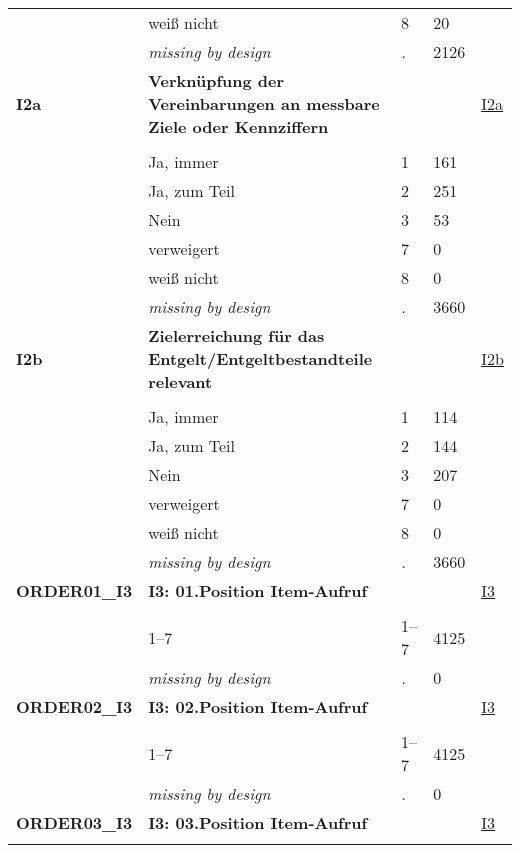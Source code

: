 \begin{longtable}{| L{2.65cm} | L{8cm} | C{1.5cm} | R{1.25cm} | C{2.25cm}  |}
   & weiß nicht & 8 & 20 &  \\ 
   & \textit{missing by design} & \textit{.} & 2126 &  \\ 
   \midrule
\textbf{I2a}\label{var:I2a} & \textbf{Verknüpfung der Vereinbarungen an messbare Ziele oder Kennziffern} &  &  & \hyperref[I2a]{I2a} \\ 
   &  &  &  &  \\ 
   & Ja, immer & 1 & 161 &  \\ 
   & Ja, zum Teil & 2 & 251 &  \\ 
   & Nein & 3 & 53 &  \\ 
   & verweigert & 7 & 0 &  \\ 
   & weiß nicht & 8 & 0 &  \\ 
   & \textit{missing by design} & \textit{.} & 3660 &  \\ 
   \midrule
\textbf{I2b}\label{var:I2b} & \textbf{Zielerreichung für das Entgelt/Entgeltbestandteile relevant} &  &  & \hyperref[I2b]{I2b} \\ 
   &  &  &  &  \\ 
   & Ja, immer & 1 & 114 &  \\ 
   & Ja, zum Teil & 2 & 144 &  \\ 
   & Nein & 3 & 207 &  \\ 
   & verweigert & 7 & 0 &  \\ 
   & weiß nicht & 8 & 0 &  \\ 
   & \textit{missing by design} & \textit{.} & 3660 &  \\ 
   \midrule
\textbf{ORDER01\_I3}\label{var:ORDER01:I3} & \textbf{I3: 01.Position Item-Aufruf} &  &  & \hyperref[I3]{I3} \\ 
   &  &  &  &  \\ 
   & 1--7 & 1--7 & 4125 &  \\ 
   & \textit{missing by design} & \textit{.} & 0 &  \\ 
   \midrule
\textbf{ORDER02\_I3}\label{var:ORDER02:I3} & \textbf{I3: 02.Position Item-Aufruf} &  &  & \hyperref[I3]{I3} \\ 
   &  &  &  &  \\ 
   & 1--7 & 1--7 & 4125 &  \\ 
   & \textit{missing by design} & \textit{.} & 0 &  \\ 
   \midrule
\textbf{ORDER03\_I3}\label{var:ORDER03:I3} & \textbf{I3: 03.Position Item-Aufruf} &  &  & \hyperref[I3]{I3} \\ 
   &  &  &  &  \\ 

\end{longtable}
